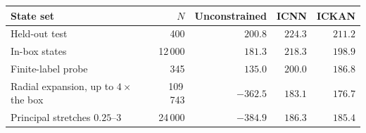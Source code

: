 \begin{tabular}{lrrrr}
\toprule
State set & $N$ & Unconstrained & ICNN & ICKAN \\
\midrule
Held-out test & 400 & $200.8$ & $224.3$ & $211.2$ \\
In-box states & 12\,000 & $181.3$ & $218.3$ & $198.9$ \\
Finite-label probe & 345 & $135.0$ & $200.0$ & $186.8$ \\
Radial expansion, up to $4\times$ the box & 109\,743 & $-362.5$ & $183.1$ & $176.7$ \\
Principal stretches $0.25$--$3$ & 24\,000 & $-384.9$ & $186.3$ & $185.4$ \\
\bottomrule
\end{tabular}

\par{}
